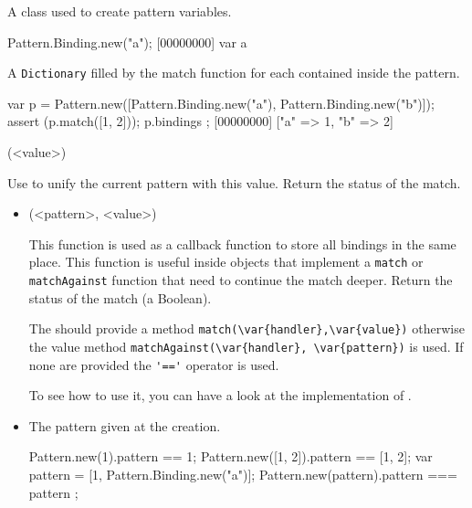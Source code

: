 \begin{urbiscriptapi}
\item[Binding]
  A class used to create pattern variables.

\begin{urbiscript}
Pattern.Binding.new("a");
[00000000] var a
\end{urbiscript}


\item[bindings]

  A \lstinline|Dictionary| filled by the match function for each
   contained inside the pattern.

\begin{urbiscript}
{
  var p = Pattern.new([Pattern.Binding.new("a"), Pattern.Binding.new("b")]);
  assert (p.match([1, 2]));
  p.bindings
};
[00000000] ["a" => 1, "b" => 2]
\end{urbiscript}


\item[match](<value>)%

  Use  to unify the current pattern with this value.
  Return the status of the match.
  \begin{itemize}


\item[matchPattern](<pattern>, <value>)%

  This function is used as a callback function to store all bindings
  in the same place.  This function is useful inside objects that
  implement a \lstinline|match| or \lstinline|matchAgainst| function
  that need to continue the match deeper.  Return the status of the
  match (a Boolean).

  The  should provide a method
  \lstinline|match(\var{handler},\var{value})| otherwise the value method
  \lstinline|matchAgainst(\var{handler}, \var{pattern})| is used.  If none
  are provided the \lstinline|'=='| operator is used.

  To see how to use it, you can have a look at the implementation of
  .



\item[pattern]
  The pattern given at the creation.
\begin{urbiassert}
Pattern.new(1).pattern == 1;
Pattern.new([1, 2]).pattern == [1, 2];
{
  var pattern = [1, Pattern.Binding.new("a")];
  Pattern.new(pattern).pattern === pattern
};
\end{urbiassert}



\end{itemize}
\end{urbiscriptapi}
